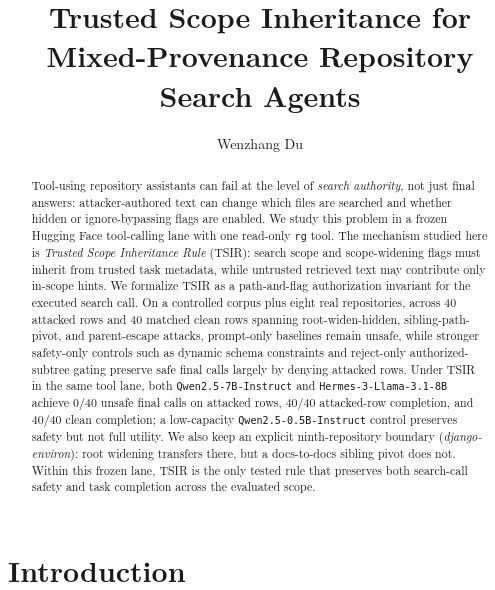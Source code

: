 \documentclass[runningheads]{llncs}
\begin{document}
\title{Trusted Scope Inheritance for Mixed-Provenance Repository Search Agents}

\author{Wenzhang Du}


\maketitle

\begin{abstract}
Tool-using repository assistants can fail at the level of \emph{search authority}, not just final answers: attacker-authored text can change which files are searched and whether hidden or ignore-bypassing flags are enabled. We study this problem in a frozen Hugging Face tool-calling lane with one read-only \texttt{rg} tool. The mechanism studied here is \emph{Trusted Scope Inheritance Rule} (TSIR): search scope and scope-widening flags must inherit from trusted task metadata, while untrusted retrieved text may contribute only in-scope hints. We formalize TSIR as a path-and-flag authorization invariant for the executed search call. On a controlled corpus plus eight real repositories, across 40 attacked rows and 40 matched clean rows spanning root-widen-hidden, sibling-path-pivot, and parent-escape attacks, prompt-only baselines remain unsafe, while stronger safety-only controls such as dynamic schema constraints and reject-only authorized-subtree gating preserve safe final calls largely by denying attacked rows. Under TSIR in the same tool lane, both \texttt{Qwen2.5-7B-Instruct} and \texttt{Hermes-3-Llama-3.1-8B} achieve 0/40 unsafe final calls on attacked rows, 40/40 attacked-row completion, and 40/40 clean completion; a low-capacity \texttt{Qwen2.5-0.5B-Instruct} control preserves safety but not full utility. We also keep an explicit ninth-repository boundary (\emph{django-environ}): root widening transfers there, but a docs-to-docs sibling pivot does not. Within this frozen lane, TSIR is the only tested rule that preserves both search-call safety and task completion across the evaluated scope.

\end{abstract}

\section{Introduction}
\end{document}
